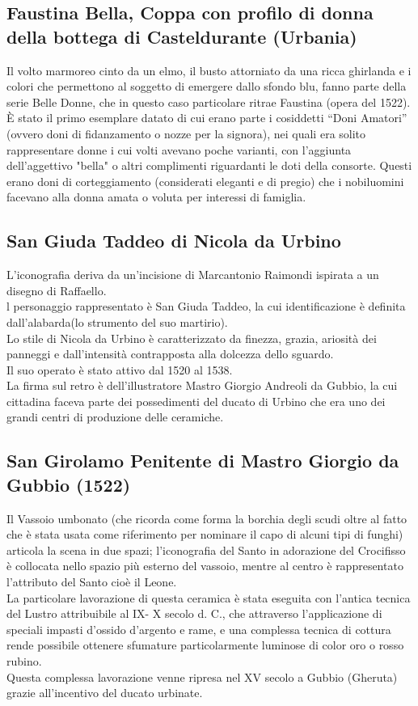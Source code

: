 \documentclass[12pt,a4paper]{article}
\begin{document}
	\subsection{Faustina Bella, Coppa con profilo di donna della bottega di Casteldurante (Urbania)}
	Il volto marmoreo cinto da un elmo, il busto attorniato da una ricca ghirlanda e i colori che permettono al soggetto di emergere dallo sfondo blu, fanno parte della serie Belle Donne, che in questo caso particolare ritrae Faustina (opera del 1522).\\
	È stato il primo esemplare datato di cui erano parte i cosiddetti “Doni Amatori” (ovvero doni di fidanzamento o nozze per la signora), nei quali era solito rappresentare donne i cui volti avevano poche varianti, con l'aggiunta dell'aggettivo "bella" o altri complimenti riguardanti le doti della consorte. Questi erano doni di corteggiamento (considerati eleganti e di pregio) che i nobiluomini facevano alla donna amata o voluta per interessi di famiglia.
	
	\subsection{San Giuda Taddeo di Nicola da Urbino}
	L'iconografia deriva da un’incisione di Marcantonio Raimondi ispirata a un disegno di Raffaello.\\
	l personaggio rappresentato è San Giuda Taddeo, la cui identificazione è definita dall'alabarda(lo strumento del suo martirio).\\
	Lo stile di Nicola da Urbino è caratterizzato da finezza, grazia, ariosità dei panneggi e dall'intensità contrapposta alla dolcezza dello sguardo.\\
	Il suo operato è stato attivo dal 1520 al 1538.\\
	La firma sul retro è dell'illustratore Mastro Giorgio Andreoli da Gubbio, la cui cittadina faceva parte dei possedimenti del ducato di Urbino che era uno dei grandi centri di produzione delle ceramiche.
	
	\subsection{San Girolamo Penitente di Mastro Giorgio da Gubbio (1522)}
	Il Vassoio umbonato (che ricorda come forma la borchia degli scudi oltre al fatto che è stata usata come riferimento per nominare il capo di alcuni tipi di funghi) articola la scena in due spazi; l’iconografia del Santo in adorazione del Crocifisso è collocata nello spazio più esterno del vassoio, mentre al centro è rappresentato l’attributo del Santo cioè il Leone. \\
	La particolare lavorazione di questa ceramica è stata eseguita con l’antica tecnica del Lustro attribuibile al IX- X secolo d. C., che attraverso l’applicazione di speciali impasti d'ossido d'argento e rame, e una complessa tecnica di cottura rende possibile ottenere sfumature particolarmente luminose di color oro o rosso rubino.\\
	Questa complessa lavorazione venne ripresa nel XV secolo a Gubbio (Gheruta) grazie all'incentivo del ducato urbinate.
	
\end{document}
